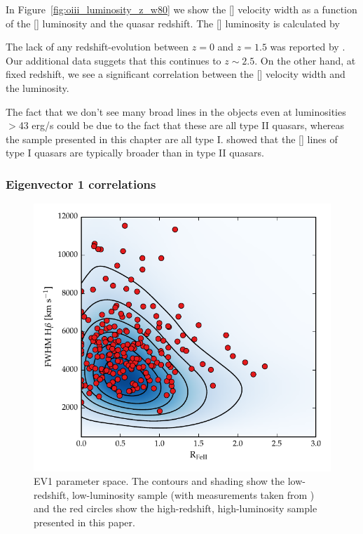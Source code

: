 In Figure~\ref{fig:oiii_luminosity_z_w80} we show the [] velocity width as a function of the [] luminosity and the quasar redshift. 
The [] luminosity is calculated by 

The lack of any redshift-evolution between $z=0$ and $z=1.5$ was reported by \citet{harrison16}.
Our additional data suggets that this continues to $z\sim2.5$. 
On the other hand, at fixed redshift, we see a significant correlation between the [] velocity width and the luminosity. 

The fact that we don't see many broad lines in the \citet{zakamska14} objects even at luminosities $>$43 erg/s could be due to the fact that these are all type II quasars, whereas the sample presented in this chapter are all type I. 
\citet{mullaney13} showed that the [] lines of type I quasars are typically broader than in type II quasars. 


\subsubsection{Eigenvector 1 correlations}

\begin{figure}
    \includegraphics[width=\columnwidth]{figures/chapter04/ev1_lowz.pdf} 
    \caption{\ac{EV1} parameter space. The contours and shading show the low-redshift, low-luminosity sample (with measurements taken from \citet{shen11}) and the red circles show the high-redshift, high-luminosity sample presented in this paper.}      
    \label{fig:ev1_lowz}
\end{figure}

